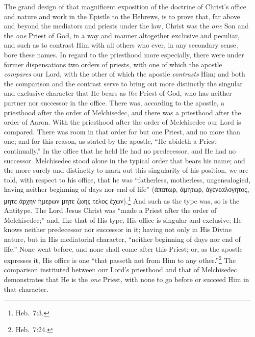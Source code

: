 \documentclass[
]{book}
\begin{document}
The grand design of that magnificent exposition of the doctrine of Christ's office and nature and work in the Epistle to the Hebrews, is to prove that, far above and beyond the mediators and priests under the law, Christ was the \emph{one} Son and the \emph{one} Priest of God, in a way and manner altogether exclusive and peculiar, and such as to contrast Him with all others who ever, in any secondary sense, bore these names. In regard to the priesthood more especially, there were under former dispensations two orders of priests, with one of which the apostle \emph{compares} our Lord, with the other of which the apostle \emph{contrasts} Him; and both the comparison and the contrast serve to bring out more distinctly the singular and exclusive character that He bears as \emph{the} Priest of God, who has neither partner nor successor in the office. There was, according to the apostle, a priesthood after the order of Melchisedec, and there was a priesthood after the order of Aaron. With the priesthood after the order of Melchisedec our Lord is compared. There was room in that order for but one Priest, and no more than one; and for this reason, as stated by the apostle, ``He abideth a Priest continually.'' In the office that he held He had no predecessor, and He had no successor. Melchisedec stood alone in the typical order that bears his name; and the more surely and distinctly to mark out this singularity of his position, we are told, with respect to his office, that he was ``fatherless, motherless, ungenealogied, having neither beginning of days nor end of life'' (\foreignlanguage{greek}{ἀπατωρ, ἀμητωρ, ἀγενεαλογητος, μητε ἀρχην ἡμερων μητε ζωης τελος ἐχων}).\footnote{Heb.~7:3.} And such as the type was, so is the Antitype. The Lord Jesus Christ was ``made a Priest after the order of Melchisedec;'' and, like that of His type, His office is singular and exclusive; He knows neither predecessor nor successor in it; having not only in His Divine nature, but in His mediatorial character, ``neither beginning of days nor end of life.'' None went before, and none shall come after this Priest; or, as the apostle expresses it, His office is one ``that passeth not from Him to any other.''\footnote{Heb.~7:24.} The comparison instituted between our Lord's priesthood and that of Melchisedec demonstrates that He is the \emph{one} Priest, with none to go before or succeed Him in that character.
\end{document}

